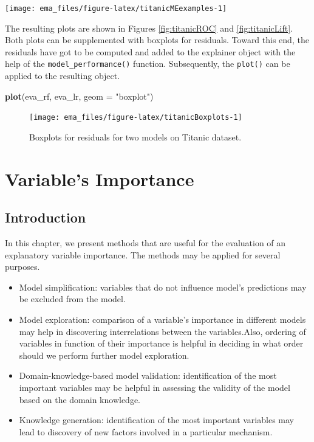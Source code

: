 \documentclass[]{krantz}
\newenvironment{Shaded}{\begin{snugshade}}{\end{snugshade}}
\newcommand{\DataTypeTok}[1]{\textcolor[rgb]{0.13,0.29,0.53}{#1}}
\newcommand{\KeywordTok}[1]{\textcolor[rgb]{0.13,0.29,0.53}{\textbf{#1}}}
\newcommand{\NormalTok}[1]{#1}
\newcommand{\StringTok}[1]{\textcolor[rgb]{0.31,0.60,0.02}{#1}}
\providecommand{\tightlist}{%
  \setlength{\itemsep}{0pt}\setlength{\parskip}{0pt}}
\begin{document}
\begin{center}\texttt{[image: ema\_files/figure-latex/titanicMEexamples-1]} \end{center}

The resulting plots are shown in Figures \ref{fig:titanicROC} and \ref{fig:titanicLift}. Both plots can be supplemented with boxplots for residuals. Toward this end, the residuals have got to be computed and added to the explainer object with the help of the \texttt{model\_performance()} function. Subsequently, the \texttt{plot()} can be applied to the resulting object.

\begin{Shaded}
\begin{Highlighting}[]
\KeywordTok{plot}\NormalTok{(eva_rf, eva_lr, }\DataTypeTok{geom =} \StringTok{"boxplot"}\NormalTok{)}
\end{Highlighting}
\end{Shaded}

\begin{figure}

{\centering \texttt{[image: ema\_files/figure-latex/titanicBoxplots-1]} 

}

\caption{Boxplots for residuals for two models on Titanic dataset.}\label{fig:titanicBoxplots}
\end{figure}

\hypertarget{featureImportance}{%
\chapter{Variable's Importance}\label{featureImportance}}

\hypertarget{featureImportanceIntro}{%
\section{Introduction}\label{featureImportanceIntro}}

In this chapter, we present methods that are useful for the evaluation of an explanatory variable importance. The methods may be applied for several purposes.

\begin{itemize}
\tightlist
\item
  Model simplification: variables that do not influence model's predictions may be excluded from the model.
\item
  Model exploration: comparison of a variable's importance in different models may help in discovering interrelations between the variables.Also, ordering of variables in function of their importance is helpful in deciding in what order should we perform further model exploration.
\item
  Domain-knowledge-based model validation: identification of the most important variables may be helpful in assessing the validity of the model based on the domain knowledge.
\item
  Knowledge generation: identification of the most important variables may lead to discovery of new factors involved in a particular mechanism.
\end{itemize}
\end{document}
